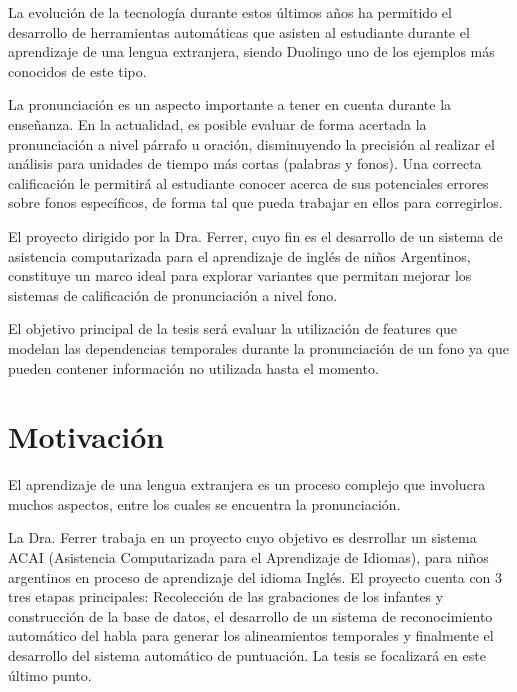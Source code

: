\documentclass[a4paper,12pt]{article} %
\begin{document}
La evolución de la tecnología durante estos últimos años ha permitido el desarrollo
de herramientas automáticas que asisten al estudiante durante el aprendizaje de una
lengua extranjera, siendo Duolingo uno de los ejemplos más conocidos de este tipo.

La pronunciación es un aspecto importante a tener en cuenta durante la enseñanza. En la
actualidad, es posible evaluar de forma acertada la pronunciación 
a nivel párrafo u oración, disminuyendo la precisión al 
realizar el análisis para unidades de tiempo más cortas (palabras y fonos). Una correcta 
calificación le permitirá al estudiante conocer acerca de sus potenciales errores 
sobre fonos específicos, de forma tal que pueda trabajar en ellos para corregirlos.

El proyecto dirigido por la Dra. Ferrer, cuyo fin es el desarrollo de un sistema de 
asistencia computarizada para el aprendizaje de inglés de niños Argentinos, constituye
un marco ideal para explorar variantes que permitan mejorar los sistemas de
calificación de pronunciación a nivel fono.

El objetivo principal de la tesis será evaluar la utilización de features que modelan
las dependencias temporales durante la pronunciación de un fono ya que pueden contener
información no utilizada hasta el momento.


\section{Motivación}

El aprendizaje de una lengua extranjera es un proceso complejo que involucra muchos 
aspectos, entre los cuales se encuentra la pronunciación.

La Dra. Ferrer trabaja en un proyecto cuyo objetivo es desrrollar un sistema ACAI 
(Asistencia Computarizada para el Aprendizaje de Idiomas), para niños argentinos 
en proceso de aprendizaje del idioma Inglés. El proyecto cuenta con 3 tres
etapas principales: Recolección de las grabaciones de los infantes y construcción de
la base de datos, el desarrollo de un sistema de reconocimiento automático del habla
para generar los alineamientos temporales y finalmente el desarrollo del sistema
automático de puntuación. La tesis se focalizará en este último punto.
\end{document}
